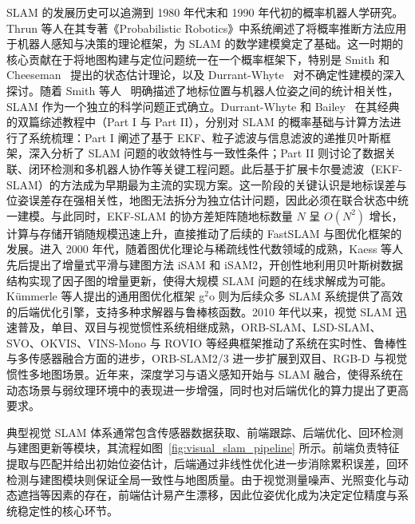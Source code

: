 SLAM 的发展历史可以追溯到 1980 年代末和 1990 年代初的概率机器人学研究。Thrun 等人\cite{thrun2005probabilistic}在其专著《Probabilistic Robotics》中系统阐述了将概率推断方法应用于机器人感知与决策的理论框架，为 SLAM 的数学建模奠定了基础。这一时期的核心贡献在于将地图构建与定位问题统一在一个概率框架下，特别是 Smith 和 Cheeseman~\cite{smith1988estimating} 提出的状态估计理论，以及 Durrant-Whyte~\cite{durrant1987uncertain} 对不确定性建模的深入探讨。随着 Smith 等人~\cite{smith1990estimating} 明确描述了地标位置与机器人位姿之间的统计相关性，SLAM 作为一个独立的科学问题正式确立。Durrant-Whyte 和 Bailey~\cite{durrantwhyte2006slam} 在其经典的双篇综述教程中（Part I 与 Part II\cite{bailey2006simultaneous}），分别对 SLAM 的概率基础与计算方法进行了系统梳理：Part I 阐述了基于 EKF、粒子滤波与信息滤波的递推贝叶斯框架，深入分析了 SLAM 问题的收敛特性与一致性条件；Part II 则讨论了数据关联、闭环检测和多机器人协作等关键工程问题。此后基于扩展卡尔曼滤波（EKF-SLAM）的方法成为早期最为主流的实现方案。这一阶段的关键认识是地标误差与位姿误差存在强相关性，地图无法拆分为独立估计问题，因此必须在联合状态中统一建模。与此同时，EKF-SLAM 的协方差矩阵随地标数量 $N$ 呈 $O(N^2)$ 增长，计算与存储开销随规模迅速上升，直接推动了后续的 FastSLAM 与图优化框架的发展。进入 2000 年代，随着图优化理论与稀疏线性代数领域的成熟，Kaess 等人先后提出了增量式平滑与建图方法 iSAM\cite{kaess2008isam} 和 iSAM2\cite{kaess2011isam2}，开创性地利用贝叶斯树数据结构实现了因子图的增量更新，使得大规模 SLAM 问题的在线求解成为可能。K{\"u}mmerle 等人\cite{kummerle2011g}提出的通用图优化框架 g$^2$o 则为后续众多 SLAM 系统提供了高效的后端优化引擎，支持多种求解器与鲁棒核函数。2010 年代以来，视觉 SLAM 迅速普及，单目、双目与视觉惯性系统相继成熟，ORB-SLAM\cite{mur2015orb}、LSD-SLAM\cite{engel2014lsd}、SVO\cite{forster2014svo}、OKVIS\cite{leutenegger2015keyframe}、VINS-Mono\cite{qin2018vins} 与 ROVIO\cite{bloesch2015robust} 等经典框架推动了系统在实时性、鲁棒性与多传感器融合方面的进步，ORB-SLAM2/3 进一步扩展到双目、RGB-D 与视觉惯性多地图场景\cite{mur2017orb,campos2021orb}。近年来，深度学习与语义感知开始与 SLAM 融合，使得系统在动态场景与弱纹理环境中的表现进一步增强，同时也对后端优化的算力提出了更高要求。

典型视觉 SLAM 体系通常包含传感器数据获取、前端跟踪、后端优化、回环检测与建图更新等模块，其流程如图~\ref{fig:visual_slam_pipeline} 所示。前端负责特征提取与匹配并给出初始位姿估计，后端通过非线性优化进一步消除累积误差，回环检测与建图模块则保证全局一致性与地图质量。由于视觉测量噪声、光照变化与动态遮挡等因素的存在，前端估计易产生漂移，因此位姿优化成为决定定位精度与系统稳定性的核心环节。

